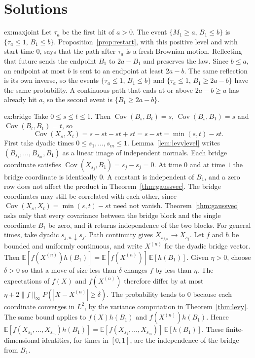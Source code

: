 \section{Solutions}

\begin{solution}{ex:maxjoint}
\writeup Let $\tau_a$ be the first hit of $a>0$. The event $\{M_1\ge a,\,B_1\le b\}$ is $\{\tau_a\le1,\,B_1\le b\}$. Proposition~\ref{prop:restart}, with this positive level and with start time $0$, says that the path after $\tau_a$ is a fresh Brownian motion. Reflecting that future sends the endpoint $B_1$ to $2a-B_1$ and preserves the law. Since $b\le a$, an endpoint at most $b$ is sent to an endpoint at least $2a-b$. The same reflection is its own inverse, so the events $\{\tau_a\le1,\,B_1\le b\}$ and $\{\tau_a\le1,\,B_1\ge 2a-b\}$ have the same probability. A continuous path that ends at or above $2a-b\ge a$ has already hit $a$, so the second event is $\{B_1\ge 2a-b\}$.
\end{solution}

\begin{solution}{ex:bridge}
\writeup Take $0\le s\le t\le 1$. Then $\operatorname{Cov}(B_s,B_t)=s$, $\operatorname{Cov}(B_s,B_1)=s$ and $\operatorname{Cov}(B_t,B_1)=t$, so
\[
 \operatorname{Cov}(X_s,X_t)=s-st-st+st=s-st=\min(s,t)-st.
\]
First take dyadic times $0\le s_1,\ldots,s_m\le 1$. Lemma~\ref{lem:levylevel} writes $(B_{s_1},\ldots,B_{s_m},B_1)$ as a linear image of independent normals. Each bridge coordinate satisfies $\operatorname{Cov}(X_{s_j},B_1)=s_j-s_j=0$. At time $0$ and at time $1$ the bridge coordinate is identically $0$. A constant is independent of $B_1$, and a zero row does not affect the product in Theorem~\ref{thm:gaussvec}. The bridge coordinates may still be correlated with each other, since $\operatorname{Cov}(X_s,X_t)=\min(s,t)-st$ need not vanish. Theorem~\ref{thm:gaussvec} asks only that every covariance between the bridge block and the single coordinate $B_1$ be zero, and it returns independence of the two blocks. For general times, take dyadic $s_{j,n}\downarrow s_j$. Path continuity gives $X_{s_{j,n}}\to X_{s_j}$. Let $f$ and $h$ be bounded and uniformly continuous, and write $X^{(n)}$ for the dyadic bridge vector. Then $\mathbb E[f(X^{(n)})h(B_1)]=\mathbb E[f(X^{(n)})]\,\mathbb E[h(B_1)]$. Given $\eta>0$, choose $\delta>0$ so that a move of size less than $\delta$ changes $f$ by less than $\eta$. The expectations of $f(X)$ and $f(X^{(n)})$ therefore differ by at most $\eta+2\|f\|_\infty P(|X-X^{(n)}|\ge\delta)$. The probability tends to $0$ because each coordinate converges in $L^2$, by the variance computation in Theorem~\ref{thm:levy}. The same bound applies to $f(X)h(B_1)$ and $f(X^{(n)})h(B_1)$. Hence $\mathbb E[f(X_{s_1},\ldots,X_{s_m})h(B_1)]=\mathbb E[f(X_{s_1},\ldots,X_{s_m})]\,\mathbb E[h(B_1)]$. These finite-dimensional identities, for times in $[0,1]$, are the independence of the bridge from $B_1$.
\end{solution}

